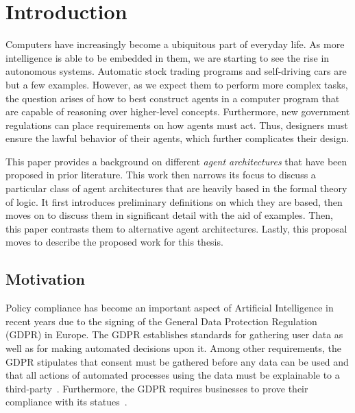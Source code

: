 \chapter{Introduction}

%
%

Computers have increasingly become a ubiquitous part of everyday life.
As more intelligence is able to be embedded in them, we are starting to see the rise in autonomous systems.
Automatic stock trading programs and self-driving cars are but a few examples.
However, as we expect them to perform more complex tasks, the question arises of how to best construct agents in a computer program that are capable of reasoning over higher-level concepts.
Furthermore, new government regulations can place requirements on how agents must act.
Thus, designers must ensure the lawful behavior of their agents, which further complicates their design.

This paper provides a background on different \textit{agent architectures} that have been proposed in prior literature.
This work then narrows its focus to discuss a particular class of agent architectures that are heavily based in the formal theory of logic.
It first introduces preliminary definitions on which they are based, then moves on to discuss them in significant detail with the aid of examples.
Then, this paper contrasts them to alternative agent architectures.
Lastly, this proposal moves to describe the proposed work for this thesis.

\section{Motivation}

Policy compliance has become an important aspect of Artificial Intelligence in recent years due to the signing of the General Data Protection Regulation (GDPR) in Europe.
The GDPR establishes standards for gathering user data as well as for making automated decisions upon it.
Among other requirements, the GDPR stipulates that consent must be gathered before any data can be used and that all actions of automated processes using the data must be explainable to a third-party~\citep{sandra_wachter_artificial_2018}.
Furthermore, the GDPR requires businesses to prove their compliance with its statues~\citep{sandra_wachter_artificial_2018}.

